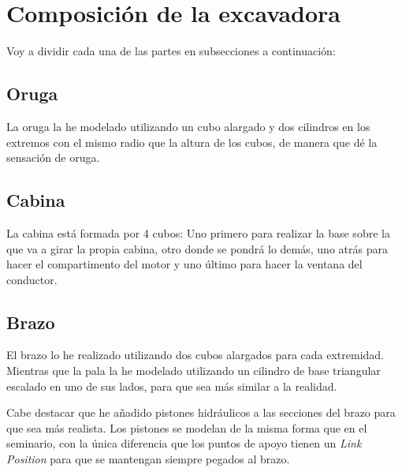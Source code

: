 \section{Composición de la excavadora}

Voy a dividir cada una de las partes en subsecciones a continuación:

\subsection{Oruga}

La oruga la he modelado utilizando un cubo alargado y dos cilindros en los extremos con el mismo radio que la altura de los cubos, de manera que dé la sensación de oruga.


\subsection{Cabina}

La cabina está formada por 4 cubos: Uno primero para realizar la base sobre la que va a girar la propia cabina, otro donde se pondrá lo demás, uno atrás para hacer el compartimento del motor y uno último para hacer la ventana del conductor.


\subsection{Brazo}

El brazo lo he realizado utilizando dos cubos alargados para cada extremidad. Mientras que la pala la he modelado utilizando un cilindro de base triangular escalado en uno de sus lados, para que sea más similar a la realidad.


Cabe destacar que he añadido pistones hidráulicos a las secciones del brazo para que sea más realista. Los pistones se modelan de la misma forma que en el seminario, con la única diferencia que los puntos de apoyo tienen un \textit{Link Position} para que se mantengan siempre pegados al brazo.

